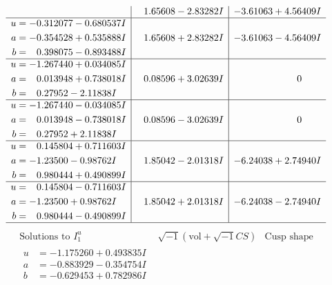 \documentclass[1p]{elsarticle_modified}
\theoremstyle{definition}
\newcommand{\I}{\sqrt{-1}}
\begin{document}
$$\begin{array}{c|c|c}
 & \phantom{-}1.65608 - 2.83282 I & -3.61063 + 4.56409 I \\ \hline\begin{aligned}
u &= -0.312077 - 0.680537 I \\
a &= -0.354528 + 0.535888 I \\
b &= \phantom{-}0.398075 - 0.893488 I\end{aligned}
 & \phantom{-}1.65608 + 2.83282 I & -3.61063 - 4.56409 I \\ \hline\begin{aligned}
u &= -1.267440 + 0.034085 I \\
a &= \phantom{-}0.013948 + 0.738018 I \\
b &= \phantom{-}0.27952 - 2.11838 I\end{aligned}
 & \phantom{-}0.08596 + 3.02639 I & \phantom{-0.000000 } 0 \\ \hline\begin{aligned}
u &= -1.267440 - 0.034085 I \\
a &= \phantom{-}0.013948 - 0.738018 I \\
b &= \phantom{-}0.27952 + 2.11838 I\end{aligned}
 & \phantom{-}0.08596 - 3.02639 I & \phantom{-0.000000 } 0 \\ \hline\begin{aligned}
u &= \phantom{-}0.145804 + 0.711603 I \\
a &= -1.23500 - 0.98762 I \\
b &= \phantom{-}0.980444 + 0.490899 I\end{aligned}
 & \phantom{-}1.85042 - 2.01318 I & -6.24038 + 2.74940 I \\ \hline\begin{aligned}
u &= \phantom{-}0.145804 - 0.711603 I \\
a &= -1.23500 + 0.98762 I \\
b &= \phantom{-}0.980444 - 0.490899 I\end{aligned}
 & \phantom{-}1.85042 + 2.01318 I & -6.24038 - 2.74940 I\\
 \hline 
 \end{array}$$\newpage$$\begin{array}{c|c|c}  
\text{Solutions to }I^u_{1}& \I (\text{vol} + \sqrt{-1}CS) & \text{Cusp shape}\\
 \hline 
\begin{aligned}
u &= -1.175260 + 0.493835 I \\
a &= -0.883929 - 0.354754 I \\
b &= -0.629453 + 0.782986 I\end{aligned}

\end{array}$$
\end{document}
